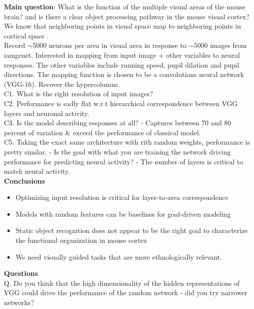 \documentclass[12pt]{article}
\begin{document}
\textbf{Main question}: What is the function of the multiple visual areas of the mouse brain? and is there a clear object processing pathway in the mouse visual cortex? \\

We know that neighboring points in visual space map to neighboring points in cortical space \cite{Wang2007}. \\

Record $\sim$5000 neurons per area in visual area in response to $\sim$5000 images from iamgenet. Interested in mapping from input image + other variables to neural responses. The other variables include running speed, pupil dilation and pupil directions. The mapping function is chosen to be a convolutions neural network (VGG-16). Recover the hypercolumns. \\

C1. What is the right resolution of input images? \\

C2. Performance is sadly flat w.r.t hierarchical correspondence between VGG layers and neuronal activity. \\

C3. Is the model describing responses at all? - Captures between 70 and 80 percent of variation \& exceed the performance of classical model. \\

C5. Taking the exact same architecture with rith random weights, performance is pretty similar. - Is the goal with what you are training the network driving performance for predicting neural activity? - The number of layers is critical to match neural activity. \\

\textbf{Conclusions}
\begin{itemize}
    \item Optimizing input resolution is critical for layer-to-area correspondence
    \item Models with random features can be baselines for goal-driven modeling
    \item Static object recognition does not appear to be the right goal to characterize the functional organization in mouse cortex
    \item We need visually guided tasks that are more ethnologically relevant. 
\end{itemize}

\textbf{Questions} \\

Q. Do you think that the high dimensionality of the hidden representations of VGG could drive the performance of the random network - did you try narrower networks? \\
\end{document}

